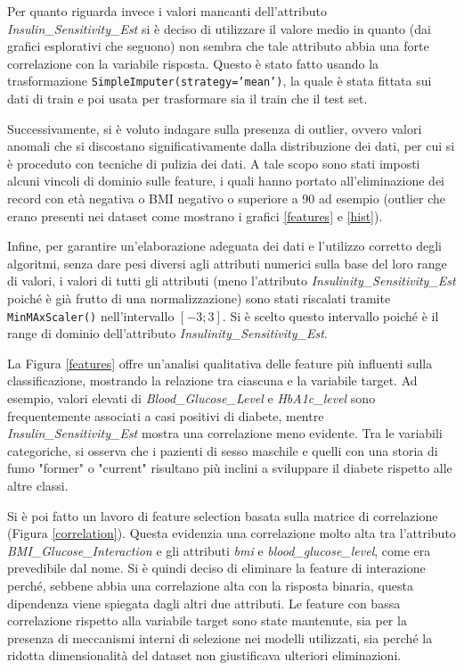 \documentclass[conference]{IEEEtran}
\begin{document}
Per quanto riguarda invece i valori mancanti dell'attributo \emph{Insulin\_Sensitivity\_Est} si è deciso di utilizzare il valore medio in quanto (dai grafici esplorativi che seguono) non sembra che tale attributo abbia una forte correlazione con la variabile risposta. 
Questo è stato fatto usando la trasformazione \texttt{SimpleImputer(strategy='mean')}, la quale è stata fittata sui dati di train e poi usata per trasformare sia il train che il test set.

Successivamente, si è voluto indagare sulla presenza di outlier, ovvero valori anomali che si discostano significativamente dalla distribuzione dei dati, per cui si è proceduto con tecniche di pulizia dei dati. A tale scopo sono stati imposti alcuni vincoli di dominio sulle feature, i quali hanno portato all'eliminazione dei record con età negativa o BMI negativo o superiore a 90 ad esempio (outlier che erano presenti nei dataset come mostrano i grafici \ref{features} e \ref{hist}). 

Infine, per garantire un’elaborazione adeguata dei dati e l’utilizzo corretto degli algoritmi, senza dare pesi diversi agli attributi numerici sulla base del loro range di valori, i valori di tutti gli attributi (meno l'attributo \emph{Insulinity\_Sensitivity\_Est} poiché è già frutto di una normalizzazione) sono stati riscalati tramite \texttt{MinMAxScaler()} nell'intervallo $\left[ -3;3\right]$. Si è scelto questo intervallo poiché è il range di dominio dell'attributo \emph{Insulinity\_Sensitivity\_Est}.

La Figura \ref{features} offre un’analisi qualitativa delle feature più influenti sulla classificazione, mostrando la relazione tra ciascuna e la variabile target. Ad esempio, valori elevati di \emph{Blood\_Glucose\_Level} e \emph{HbA1c\_level} sono frequentemente associati a casi positivi di diabete, mentre \emph{Insulin\_Sensitivity\_Est} mostra una correlazione meno evidente. Tra le variabili categoriche, si osserva che i pazienti di sesso maschile e quelli con una storia di fumo "former" o "current" risultano più inclini a sviluppare il diabete rispetto alle altre classi.


Si è poi fatto un lavoro di feature selection basata sulla matrice di correlazione (Figura \ref{correlation}). Questa evidenzia una correlazione molto alta tra l'attributo \emph{BMI\_Glucose\_Interaction} e gli attributi \emph{bmi} e \emph{blood\_glucose\_level}, come era prevedibile dal nome. Si è quindi deciso di eliminare la feature di interazione perché, sebbene abbia una correlazione alta con la risposta binaria, questa dipendenza viene spiegata dagli altri due attributi. Le feature con bassa correlazione rispetto alla variabile target sono state mantenute, sia per la presenza di meccanismi interni di selezione nei modelli utilizzati, sia perché la ridotta dimensionalità del dataset non giustificava ulteriori eliminazioni.
\end{document}
